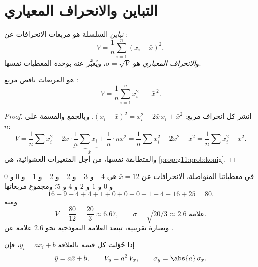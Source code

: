 \section{التباين والانحراف المعياري}

\begin{definition}\label{def:g11:stat:variance}
\emph{تباين} السلسلة هو 
مربعات الانحرافات عن :
\[
V = \frac{1}{n}\sum_{i=1}^{n} (x_i - \bar x)^2,
\]
و\emph{الانحراف المعياري} هو
$\sigma = \sqrt{V}$، ويُعبَّر عنه بوحدة المعطيات نفسها.
\end{definition}

\begin{proposition}\label{prop:g11:stat:shortcut}
 هو  المربعات ناقص مربع :
\[
V = \frac{1}{n}\sum_{i=1}^{n} x_i^2 \;-\; \bar x^{\,2}.
\]
\end{proposition}

\begin{proof}
انشر كل انحراف مربع:
$(x_i - \bar x)^2 = x_i^2 - 2\bar x\, x_i + \bar x^2$. وبالجمع
والقسمة على $n$:
\[
V = \frac1n \sum x_i^2 - 2\bar x \cdot \underbrace{\frac1n \sum
x_i}_{=\ \bar x} + \frac1n \cdot n\bar x^2
= \frac1n\sum x_i^2 - 2\bar x^2 + \bar x^2
= \frac1n\sum x_i^2 - \bar x^2 .
\]
والمتطابقة نفسها، من أجل المتغيرات العشوائية، هي
\cref{prop:g11:prob:konig}.
\end{proof}

\begin{example}\label{ex:g11:stat:variance}
في معطياتنا المتواصلة، الانحرافات عن $\bar x = 12$ هي $-4$
و $-3$ و $-2$ و $-2$ و $-1$ و $0$ و $0$ و $0$ و $1$ و $2$ و $4$ و $5$؛ ومجموع
مربعاتها
\[
16 + 9 + 4 + 4 + 1 + 0 + 0 + 0 + 1 + 4 + 16 + 25 = 80 .
\]
ومنه
\[
V = \frac{80}{12} = \frac{20}{3} \approx 6.67,
\qquad
\sigma = \sqrt{20/3} \approx 2.6 \text{ علامة}.
\]
وبعبارة تقريبية، تبتعد العلامة النموذجية نحو $2.6$ علامة عن
.
\end{example}

\begin{proposition}\label{prop:g11:stat:affine}
إذا حُوّلت كل قيمة بالعلاقة $y_i = a x_i + b$، فإن
\[
\bar y = a \bar x + b,
\qquad
V_y = a^2\, V_x,
\qquad
\sigma_y = \abs{a}\,\sigma_x .
\]
\end{proposition}

